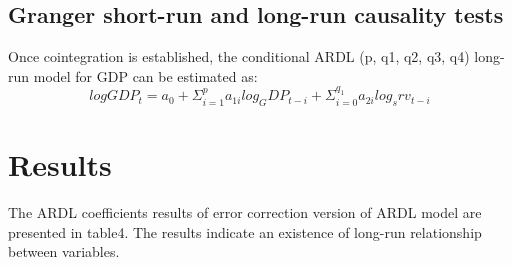 \documentclass[12pt,a4 paper,title page]{article}
\begin{document}
\subsection{Granger short-run and long-run causality tests}
Once cointegration is established, the conditional ARDL (p, q1, q2, q3, q4) long-run model for GDP can be estimated as:
\begin{equation}
 log GDP_t = a_0 + \Sigma^p_{i=1}a_{1i}log_GDP_{t-i} + \Sigma^{q_1}_{i=0} a_{2i}log_srv_{t-i}
\end{equation}
\section{Results}
The ARDL coefficients results of error correction version of ARDL model are presented in table4. The results indicate an existence of long-run relationship between variables.
\hfill \break
\end{document}
